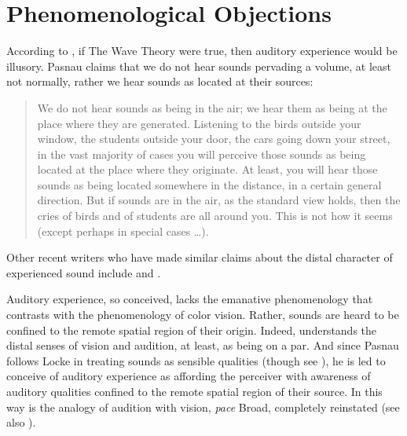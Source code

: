 
\section{Phenomenological Objections} %
\label{sec:phenomenological_objections}

According to \citet{Pasnau:1999ss}, if The Wave Theory were true, then auditory experience would be illusory. Pasnau claims that we do not hear sounds pervading a volume, at least not normally, rather we hear sounds as located at their sources:
\begin{quote}
	We do not hear sounds as being in the air; we hear them as being at the place where they are generated. Listening to the birds outside your window, the students outside your door, the cars going down your street, in the vast majority of cases you will perceive those sounds as being located at the place where they originate. At least, you will hear those sounds as being located somewhere in the distance, in a certain general direction. But if sounds are in the air, as the standard view holds, then the cries of birds and of students are all around you. This is not how it seems (except perhaps in special cases \ldots). \citep[311]{Pasnau:1999ss}
\end{quote}
Other recent writers who have made similar claims about the distal character of experienced sound include \citet{Casati:1994aa} and \citet{OCallaghan:2007xy}.

Auditory experience, so conceived, lacks the emanative phenomenology that \citet{Broad:1952kx} contrasts with the phenomenology of color vision. Rather, sounds are heard to be confined to the remote spatial region of their origin. Indeed,  \citet{Pasnau:1999ss} understands the distal senses of vision and audition, at least, as being on a par. And since Pasnau follows Locke in treating sounds as sensible qualities (though see \citealt{Pasnau:2009ys}), he is led to conceive of auditory experience as affording the perceiver with awareness of auditory qualities confined to the remote spatial region of their source. In this way is the analogy of audition with vision, \emph{pace} Broad, completely reinstated (see also \citealt{Kulvicki:2008aa}). 

